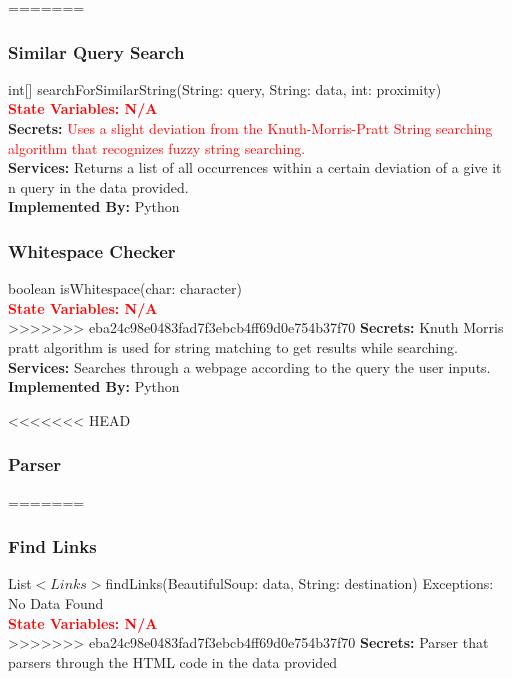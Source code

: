 \documentclass[titlepage]{article}
\begin{document}
{=======
\subsubsection{Similar Query Search}
int[] searchForSimilarString(String: query, String: data, int: proximity)\\
\textcolor{red}{\textbf{State Variables: N/A}}\\
\textbf{Secrets:}
\textcolor{red}{Uses a slight deviation from the Knuth-Morris-Pratt String searching algorithm that recognizes fuzzy string searching.}\\

\textbf{Services:}
Returns a list of all occurrences within a certain deviation of a give it n query in the data provided.\\

\textbf{Implemented By:}
Python

\subsubsection{Whitespace Checker}
boolean isWhitespace(char: character)\\
\textcolor{red}{\textbf{State Variables: N/A}}\\
>>>>>>> eba24c98e0483fad7f3ebcb4ff69d0e754b37f70
\textbf{Secrets:}
 Knuth Morris pratt algorithm is used for string matching to get results while searching.\\ 

\textbf{Services:}
Searches through a webpage according to the query the user inputs.\\

\textbf{Implemented By:}
Python

<<<<<<< HEAD
\subsubsection{Parser}

=======
\subsubsection{Find Links}
List${<Links> }$findLinks(BeautifulSoup: data, String: destination) Exceptions: No Data Found\\
\textcolor{red}{\textbf{State Variables: N/A}}\\
>>>>>>> eba24c98e0483fad7f3ebcb4ff69d0e754b37f70
\textbf{Secrets:}
Parser that parsers through the HTML code in the data provided\\

}
\end{document}
